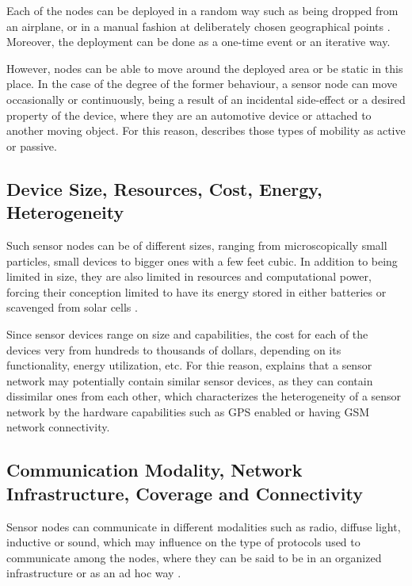 Each of the nodes can be deployed in a random way such as being dropped
from an airplane, or in a manual fashion at deliberately chosen geographical 
points \cite{sn-intro01}. Moreover, the deployment can be done as a one-time
event or an iterative way. 

However, nodes can be able to move around the deployed area or be static in
this place. In the case of the degree of the former behaviour, a sensor node
can move occasionally or continuously, being a result of an incidental 
side-effect or a desired property of the device, where they are an automotive
device or attached to another moving object. For this reason, \cite{sn-intro01} 
describes those types of mobility as active or passive.

\subsection{Device Size, Resources, Cost, Energy, Heterogeneity}

Such sensor nodes can be of different sizes, ranging from microscopically small
particles, small devices to bigger ones with a few feet cubic. In addition to
being limited in size, they are also limited in resources and computational
power, forcing their conception limited to have its energy stored in either
batteries or scavenged from solar cells \cite{sn-intro01}.

Since sensor devices range on size and capabilities, the cost for each of the
devices very from hundreds to thousands of dollars, depending on its
functionality, energy utilization, etc. For thie reason, \cite{sn-intro01}
explains that a sensor network may potentially contain similar sensor devices,
as they can contain dissimilar ones from each other, which characterizes the heterogeneity 
of a sensor network by the hardware capabilities such as GPS enabled or having
GSM  network connectivity.

\subsection{Communication Modality, Network Infrastructure, Coverage and
Connectivity}
\label{sec:sn-infrastructure}

Sensor nodes can communicate in different modalities such as radio, diffuse
light, inductive or sound, which may influence on the type of protocols used to
communicate among the nodes, where they can be said to be in an organized
infrastructure or as an ad hoc way \cite{sn-intro01}.


